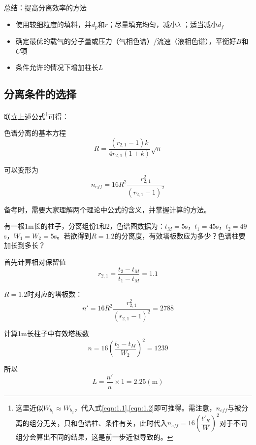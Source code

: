 \begin{emptytcb*}{总结：提高分离效率的方法}{}
	\begin{itemize}
		\item 使用较细粒度的填料，并$d_p$和$r$；尽量填充均匀，减小$\lambda$
		；适当减小$d_f$
		\item 确定最优的载气的分子量或压力（气相色谱）/流速（液相色谱），平衡好$B$和$C$项
		\item 条件允许的情况下增加柱长$L$
	\end{itemize}
\end{emptytcb*}

\subsection{分离条件的选择}
联立上述公式\footnote{这里近似$W_{b_1}\approx W_{b_2}$，代入式\eqref{eqn:1.1},\eqref{eqn:1.2}即可推得。需注意，$n_{eff}$与被分离的组分无关，只和色谱柱、条件有关，此时代入$n_{eff}=16{\left(\dfrac{t'_R}{W}\right)}^2$对于不同组分会算出不同的结果，这是前一步近似导致的。}可得：

\begin{theorem*}{色谱分离的基本方程}{}
	\begin{equation}
		R=\dfrac{(r_{2,1}-1)k}{4r_{2,1} (1+k)} \sqrt{n}
	\end{equation}
	
	可以变形为
	\begin{equation}
		n_{eff}=16R^2\dfrac{r_{2,1}^2}{(r_{2,1}-1)^2}
	\end{equation}
\end{theorem*}

备考时，需要大家理解两个理论中公式的含义，并掌握计算的方法。
\vspace{3pt}
\begin{example}
	有一根$1$m长的柱子，分离组份1和2，色谱图数据为：$t_M=5$s，$t_1=45$s，$t_2=49$s，$W_1=W_2=5$s。若欲得到$R=1.2$的分离度，有效塔板数应为多少？色谱柱要加长到多长？
	
	\solve 
	首先计算相对保留值$$r_{2,1}=\dfrac{t_2-t_M}{t_1-t_M}=1.1$$
	
	$R=1.2$时对应的塔板数：$$n'=16R^2\dfrac{r_{2,1}^2}{(r_{2,1}-1)^2}=2788$$
	
	计算1m长柱子中有效塔板数$$n=16{\left(\dfrac{t_2-t_M}{W_2}\right)}^2=1239$$
	
	所以$$L=\dfrac{n'}{n}\times 1=2.25(\mathrm{m})$$
	
\end{example}


